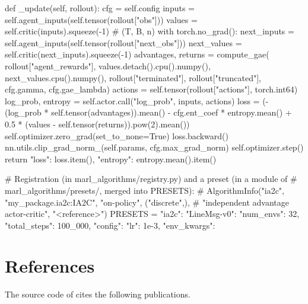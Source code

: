 \begin{pycode}
    def _update(self, rollout):
        cfg = self.config
        inputs = self.agent_inputs(self.tensor(rollout["obs"]))
        values = self.critic(inputs).squeeze(-1)                  # (T, B, n)
        with torch.no_grad():
            next_inputs = self.agent_inputs(self.tensor(rollout["next_obs"]))
            next_values = self.critic(next_inputs).squeeze(-1)
        advantages, returns = compute_gae(
            rollout["agent_rewards"], values.detach().cpu().numpy(),
            next_values.cpu().numpy(), rollout["terminated"],
            rollout["truncated"], cfg.gamma, cfg.gae_lambda)
        actions = self.tensor(rollout["actions"], torch.int64)
        log_prob, entropy = self.actor.call("log_prob", inputs, actions)
        loss = (-(log_prob * self.tensor(advantages)).mean()
                - cfg.ent_coef * entropy.mean()
                + 0.5 * (values - self.tensor(returns)).pow(2).mean())
        self.optimizer.zero_grad(set_to_none=True)
        loss.backward()
        nn.utils.clip_grad_norm_(self.params, cfg.max_grad_norm)
        self.optimizer.step()
        return {"loss": loss.item(), "entropy": entropy.mean().item()}


# Registration (in marl_algorithms/registry.py) and a preset (in a module of
# marl_algorithms/presets/, merged into PRESETS):
# AlgorithmInfo("ia2c", "my_package.ia2c:IA2C", "on-policy", ("discrete",),
#               "independent advantage actor-critic", "<reference>")
PRESETS = {"ia2c": {"LineMsg-v0": {"num_envs": 32, "total_steps": 100_000,
                                   "config": {"lr": 1e-3}, "env_kwargs": {}}}}
\end{pycode}

\section{References}\label{sec:marl-references}

The source code of  cites the following publications.

